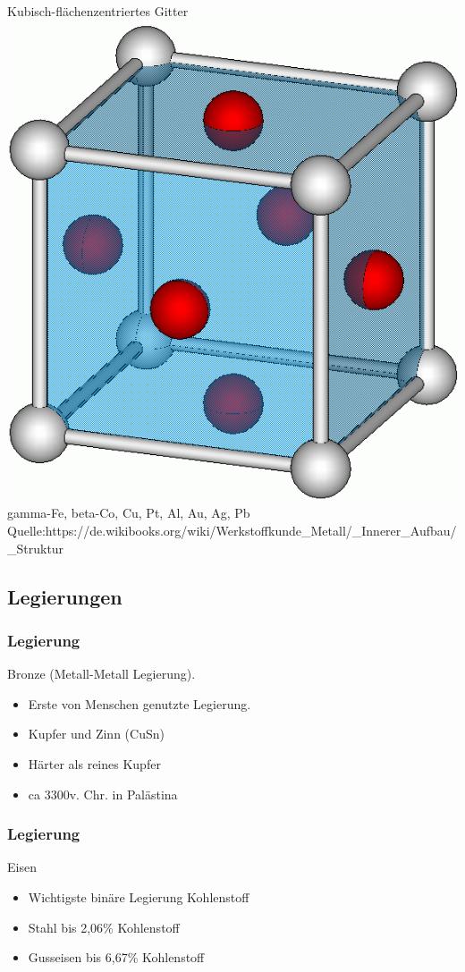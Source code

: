 \begin{frame}[c]
	\centering
	Kubisch-flächenzentriertes Gitter
	\\
	\includegraphics[height=0.4\textwidth]{medien/Kfz.png}
	\\
	\tiny{ gamma-Fe, beta-Co, Cu, Pt, Al, Au, Ag, Pb}
	\\
	\tiny{Quelle:https://de.wikibooks.org/wiki/Werkstoffkunde\_Metall/\_Innerer\_Aufbau/\_Struktur}
\end{frame}

\subsection{Legierungen}
\label{grnd:legierungen}
\begin{frame}[c]\frametitle{Legierung}
	Bronze (Metall-Metall Legierung).
	\begin{itemize}
		\item{Erste von Menschen genutzte Legierung.}
		\item{Kupfer und Zinn (CuSn)}
		\item{Härter als reines Kupfer}
		\item{ca 3300v. Chr. in Palästina}
	\end{itemize}
\end{frame}

\begin{frame}[c]\frametitle{Legierung}
	Eisen
	\begin{itemize}
		\item{Wichtigste binäre Legierung Kohlenstoff}
		\item{Stahl bis 2,06\% Kohlenstoff}
		\item{Gusseisen bis 6,67\% Kohlenstoff}
	\end{itemize}
\end{frame}

